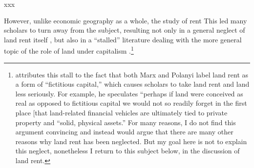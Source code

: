 xxx

However, unlike economic geography as a whole, the study of rent This
led many scholars to turn away from the subject, resulting not only
in a general neglect of land rent itself \citep{ward2016theshitty},
but also in a ``stalled'' literature dealing with the more general
topic of the role of land under capitalism \citep{christophers2016forreal,park2014landrent}.\footnote{\citet{christophers2016forreal} attributes this stall to the fact
that both Marx and Polanyi label land rent as a form of ``fictitious
capital,'' which causes scholars to take land rent and land less
seriously. For example, he speculates \citet[144]{christophers2016forreal}
``perhaps if land were conceived as real as opposed to fictitious
capital we would not so readily forget in the first place {[}that
land-related financial vehicles are ultimately tied to private property
and ``solid, physical assets.'' For many reasons, I do not find
this argument convincing and instead would argue that there are many
other reasons why land rent has been neglected. But my goal here is
not to explain this neglect, nonetheless I return to this subject
below, in the discussion of land rent.}

\begin{comment}


\end{comment}

\printbibliography[title={References}]
